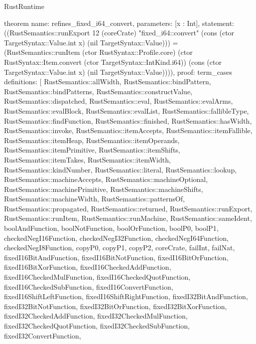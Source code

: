 \begin{lexlean}{RustRuntime}
\begin{semanticmodule}
theorem{
  name: refines_fixed_i64_convert,
  parameters: [x : Int],
  statement: ((RustSemantics::runExport 12 (coreCrate) "fixed_i64::convert" (cons (ctor TargetSyntax::Value.int x) (nil TargetSyntax::Value))) = (RustSemantics::runItem (ctor RustSyntax::Profile.core) (ctor RustSyntax::Item.convert (ctor TargetSyntax::IntKind.i64)) (cons (ctor TargetSyntax::Value.int x) (nil TargetSyntax::Value)))),
  proof: term_cases{
    definitions: [
      RustSemantics::allWidth,
      RustSemantics::bindPattern,
      RustSemantics::bindPatterns,
      RustSemantics::constructValue,
      RustSemantics::dispatched,
      RustSemantics::eval,
      RustSemantics::evalArms,
      RustSemantics::evalBlock,
      RustSemantics::evalList,
      RustSemantics::fallibleType,
      RustSemantics::findFunction,
      RustSemantics::finished,
      RustSemantics::hasWidth,
      RustSemantics::invoke,
      RustSemantics::itemAccepts,
      RustSemantics::itemFallible,
      RustSemantics::itemHeap,
      RustSemantics::itemOperands,
      RustSemantics::itemPrimitive,
      RustSemantics::itemShifts,
      RustSemantics::itemTakes,
      RustSemantics::itemWidth,
      RustSemantics::kindNumber,
      RustSemantics::literal,
      RustSemantics::lookup,
      RustSemantics::machineAccepts,
      RustSemantics::machineOptional,
      RustSemantics::machinePrimitive,
      RustSemantics::machineShifts,
      RustSemantics::machineWidth,
      RustSemantics::patternsOf,
      RustSemantics::propagated,
      RustSemantics::returned,
      RustSemantics::runExport,
      RustSemantics::runItem,
      RustSemantics::runMachine,
      RustSemantics::sameIdent,
      boolAndFunction,
      boolNotFunction,
      boolOrFunction,
      boolP0,
      boolP1,
      checkedNegI16Function,
      checkedNegI32Function,
      checkedNegI64Function,
      checkedNegI8Function,
      copyP0,
      copyP1,
      copyP2,
      coreCrate,
      failInt,
      failNat,
      fixedI16BitAndFunction,
      fixedI16BitNotFunction,
      fixedI16BitOrFunction,
      fixedI16BitXorFunction,
      fixedI16CheckedAddFunction,
      fixedI16CheckedMulFunction,
      fixedI16CheckedQuotFunction,
      fixedI16CheckedSubFunction,
      fixedI16ConvertFunction,
      fixedI16ShiftLeftFunction,
      fixedI16ShiftRightFunction,
      fixedI32BitAndFunction,
      fixedI32BitNotFunction,
      fixedI32BitOrFunction,
      fixedI32BitXorFunction,
      fixedI32CheckedAddFunction,
      fixedI32CheckedMulFunction,
      fixedI32CheckedQuotFunction,
      fixedI32CheckedSubFunction,
      fixedI32ConvertFunction,
}}
\end{semanticmodule}
\end{lexlean}
